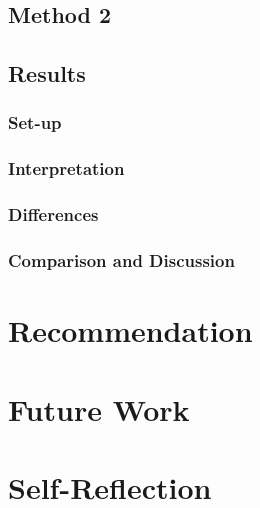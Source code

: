 \documentclass{article}
\theoremstyle{plain}
\theoremstyle{definition}
\theoremstyle{remark}
\begin{document}
\subsection{Method 2} 



\subsection{Results} 
\subsubsection{Set-up}

\subsubsection{Interpretation}

\subsubsection{Differences}

\subsubsection{Comparison and Discussion}


\section{Recommendation} 


\section{Future Work} 


\section{Self-Reflection} 








\end{document}
